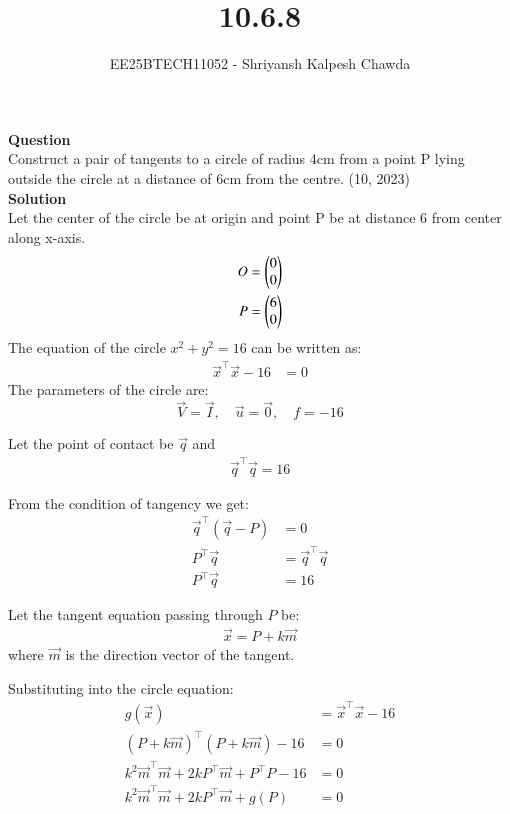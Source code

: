 \documentclass[article]{IEEEtran}
\begin{document}
	\title{10.6.8}
	\author{EE25BTECH11052 - Shriyansh Kalpesh Chawda}
	\maketitle
	\textbf{Question}\\
	Construct a pair of tangents to a circle of radius 4cm from a point P lying outside the circle at 
	a distance of 6cm from the centre.
	\hfill{(10, 2023)}\\
	
	\textbf{Solution}\\
	Let the center of the circle be at origin and point P be at distance 6 from center along x-axis.
	\begin{align}
		O &= \begin{pmatrix}0\\0\end{pmatrix}\\
		P &= \begin{pmatrix}6\\0\end{pmatrix}
	\end{align}
	The equation of the circle $x^2 + y^2 = 16$ can be written as:
	\begin{align}
		\vec{x}^\top \vec{x} - 16 &= 0
	\end{align}
	The parameters of the circle are:
	\begin{equation}
		\vec{V} = \vec{I}, \quad \vec{u} = \vec{0}, \quad f = -16
	\end{equation}
	
	Let the point of contact be $\vec{q}$ and
	\begin{align}
		\vec{q}^\top\vec{q} = 16
	\end{align}
	
	From the condition of tangency we get:
	\begin{align}
		\vec{q}^\top(\vec{q} - P) &= 0\\
		P^\top\vec{q} &= \vec{q}^\top\vec{q}\\
		P^\top\vec{q} &= 16
	\end{align}
	
	Let the tangent equation passing through $P$ be:
	\begin{align}
		\vec{x} = P + k\vec{m}
	\end{align}
	where $\vec{m}$ is the direction vector of the tangent.
	
	Substituting into the circle equation:
	\begin{align}
		g(\vec{x}) &= \vec{x}^\top\vec{x} - 16\\
		(P + k\vec{m})^\top(P + k\vec{m}) - 16 &= 0\\
		k^2\vec{m}^\top\vec{m} + 2kP^\top\vec{m} + P^\top P - 16 &= 0\\
		k^2\vec{m}^\top\vec{m} + 2kP^\top\vec{m} + g(P) &= 0
	\end{align}
	
\end{document}
